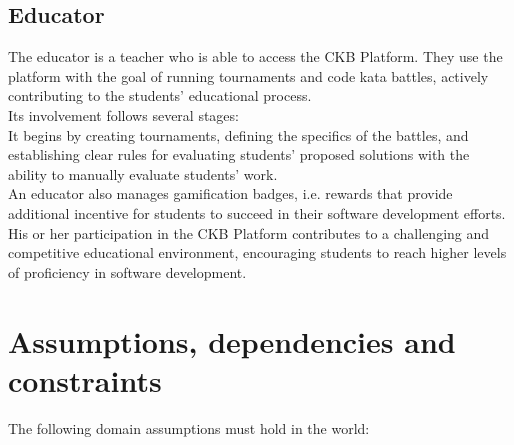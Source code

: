 \subsection{Educator}
The educator is a teacher who is able to access the CKB Platform. They use the platform with the goal of running tournaments and code kata battles, actively contributing to the students' educational process.\\
Its involvement follows several stages:\\
It begins by creating tournaments, defining the specifics of the battles, and establishing clear rules for evaluating students' proposed solutions with the ability to manually evaluate students' work.\\
An educator also manages gamification badges, i.e. rewards that provide additional incentive for students to succeed in their software development efforts.\\
His or her participation in the CKB Platform contributes to a challenging and competitive educational environment, encouraging students to reach higher levels of proficiency in software development.

\section{Assumptions, dependencies and constraints}
The following domain assumptions must hold in the world:

\begin{enumerate}[label=\textbf{D\arabic*}:,ref=D\arabic*,leftmargin=1.3cm]
\end{enumerate}